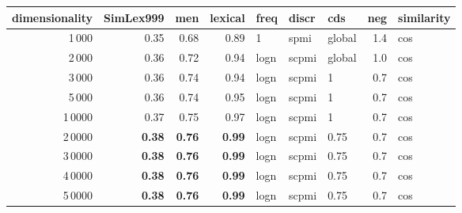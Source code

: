 \begin{tabular}{rrrrlllrl}
\toprule
 dimensionality &  SimLex999 &   men &  lexical &  freq &  discr &     cds &  neg & similarity \\
\midrule
           1\,000 &       0.35 &  0.68 &     0.89 &     1 &   spmi &  global &  1.4 &        cos \\
           2\,000 &       0.36 &  0.72 &     0.94 &  logn &  scpmi &  global &  1.0 &        cos \\
           3\,000 &       0.36 &  0.74 &     0.94 &  logn &  scpmi &       1 &  0.7 &        cos \\
           5\,000 &       0.36 &  0.74 &     0.95 &  logn &  scpmi &       1 &  0.7 &        cos \\
          1\,0000 &       0.37 &  0.75 &     0.97 &  logn &  scpmi &       1 &  0.7 &        cos \\
          2\,0000 &       \textbf{0.38} &  \textbf{0.76} &     \textbf{0.99} &  logn &  scpmi &    0.75 &  0.7 &        cos \\
          3\,0000 &       \textbf{0.38} &  \textbf{0.76} &     \textbf{0.99} &  logn &  scpmi &    0.75 &  0.7 &        cos \\
          4\,0000 &       \textbf{0.38} &  \textbf{0.76} &     \textbf{0.99} &  logn &  scpmi &    0.75 &  0.7 &        cos \\
          5\,0000 &       \textbf{0.38} &  \textbf{0.76} &     \textbf{0.99} &  logn &  scpmi &    0.75 &  0.7 &        cos \\
\bottomrule
\end{tabular}
